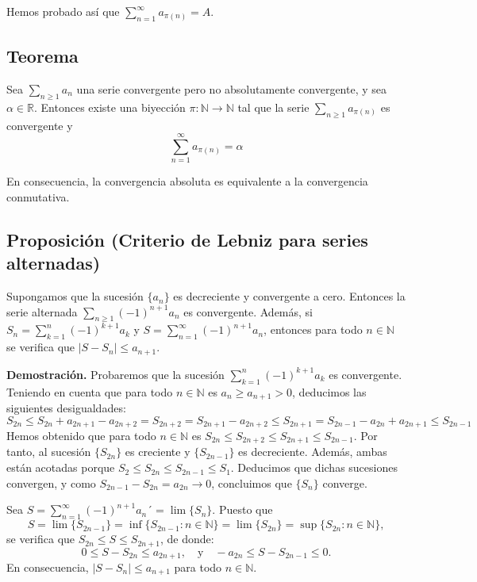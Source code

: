 \documentclass[10pt,a4paper]{article}
\begin{document}
	Hemos probado así que $\displaystyle\sum_{n = 1}^\infty a_{\pi(n)} = A$.
	
	\subsection{Teorema}
	
	Sea $\displaystyle \sum_{n \geq 1} a_n$ una serie convergente pero no absolutamente convergente, y sea $\alpha \in \mathbb{R}$. Entonces existe una biyección $\pi : \mathbb{N} \rightarrow \mathbb{N}$ tal que la serie $\displaystyle \sum_{n \geq 1} a_{\pi(n)}$ es convergente y
	$$ \sum_{n = 1} ^\infty a_{\pi(n)} = \alpha$$
	
	En consecuencia, la convergencia absoluta es equivalente a la convergencia conmutativa.
	
	\subsection{Proposición (Criterio de Lebniz para series alternadas)}
	
	Supongamos que la sucesión $\{a_n\}$ es decreciente y convergente a cero. Entonces la serie alternada $\displaystyle \sum_{n \geq 1} (-1)^{n+1}a_n$ es convergente. Además, si $S_n = \displaystyle \sum_{k = 1}^n (-1)^{k+1}a_k$ y $S = \displaystyle \sum_{n = 1}^\infty (-1)^{n+1}a_n$, entonces para todo $n \in \mathbb{N}$ se verifica que $|S - S_n| \leq a_{n+1}$.
	
	\textbf{Demostración. }Probaremos que la sucesión $\displaystyle \sum_{k = 1}^n (-1)^{k+1}a_k$ es convergente. Teniendo en cuenta que para todo $n \in \mathbb{N}$ es $a_n \geq a_{n+1} > 0$, deducimos las siguientes desigualdades:
	$$S_{2n} \leq S_{2n} + a_{2n+1} - a_{2n+2} =S_{2n+2} = S_{2n+1} - a_{2n+2} \leq S_{2n+1} = S_{2n-1}-a_{2n} + a_{2n+1} \leq S_{2n-1}$$
	Hemos obtenido que para todo $n \in \mathbb{N}$ es $S_{2n} \leq S_{2n+2} \leq S_{2n+1} \leq S_{2n-1}$. Por tanto, al sucesión $\{S_{2n}\}$ es creciente y $\{S_{2n-1}\}$ es decreciente. Además, ambas están acotadas porque $S_2 \leq S_{2n} \leq S_{2n-1} \leq S_1$. Deducimos que dichas sucesiones convergen, y como $S_{2n-1} - S_{2n} = a_{2n} \rightarrow 0$, concluimos que $\{S_n\}$ converge.
	
	Sea $S = \displaystyle \sum_{n = 1}^\infty (-1)^{n+1}a_n´= \lim\{S_n\}$. Puesto que 
	$$S = \lim\{ S_{2n-1}\} = \inf \{S_{2n-1} : n \in \mathbb{N}\} = \lim \{S_{2n}\} = \sup \{S_{2n} : n \in \mathbb{N}\},$$
	se verifica que $S_{2n} \leq S \leq S_{2n+1}$, de donde:
	$$ 0 \leq S - S_{2n} \leq a_{2n+1}, \quad \text{y} \quad -a_{2n} \leq S - S_{2n-1} \leq 0.$$
	En consecuencia, $|S- S_n| \leq a_{n+1}$ para todo $n \in \mathbb{N}$.
	
\end{document}
